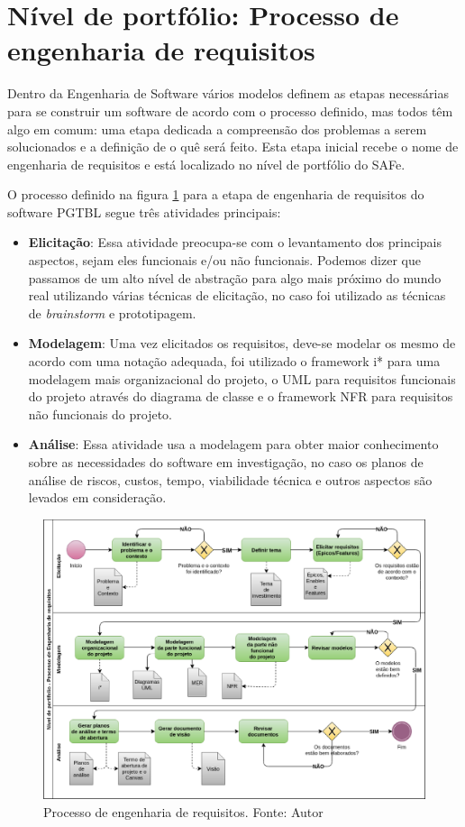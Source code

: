 \section{Nível de portfólio: Processo de engenharia de requisitos}

Dentro da Engenharia de Software vários modelos definem as etapas necessárias para se construir um software de acordo com o processo definido, mas todos têm algo em comum: uma etapa dedicada a compreensão dos problemas a serem solucionados e a definição de o quê será feito. Esta etapa inicial recebe o nome de engenharia de requisitos e está localizado no nível de portfólio do SAFe.

O processo definido na figura \ref{fig:requisitos} para a etapa de engenharia de requisitos do software PGTBL segue três atividades principais:

\begin{itemize}
  \item \textbf{Elicitação}: Essa atividade preocupa-se com o levantamento dos principais aspectos, sejam eles funcionais e/ou não funcionais. Podemos dizer que passamos de um alto nível de abstração para algo mais próximo do mundo real utilizando várias técnicas de elicitação, no caso foi utilizado as técnicas de \textit{brainstorm} e prototipagem.
  \item \textbf{Modelagem}: Uma vez elicitados os requisitos, deve-se modelar os mesmo de acordo com uma notação adequada, foi utilizado o framework i* para uma modelagem mais organizacional do projeto, o UML para requisitos funcionais do projeto através do diagrama de classe e o framework NFR para requisitos não funcionais do projeto.
  \item \textbf{Análise}: Essa atividade usa a modelagem para obter maior conhecimento sobre as necessidades do software em investigação, no caso os planos de análise de riscos, custos, tempo, viabilidade técnica e outros aspectos são levados em
consideração.
\end{itemize}

\begin{figure}[h!]
	\centering
  \includegraphics[keepaspectratio=true,scale=0.5]{figuras/requisitos.eps}
  \caption[Processo de engenharia de requisitos.]{Processo de engenharia de requisitos. Fonte: Autor}
	\label{fig:requisitos}
\end{figure}

